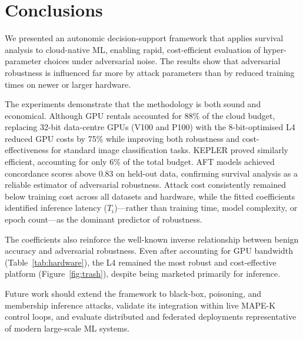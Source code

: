 \documentclass[conference]{IEEEtran}%
\begin{document}
\section{Conclusions}
\label{conclusion}

We presented an autonomic decision-support framework that applies survival analysis to cloud-native ML, enabling rapid, cost-efficient evaluation of hyper-parameter choices under adversarial noise. 
The results show that adversarial robustness is influenced far more by attack parameters than by reduced training times on newer or larger hardware.

The experiments demonstrate that the methodology is both sound and economical. 
Although GPU rentals accounted for 88\% of the cloud budget, replacing 32-bit data-centre GPUs (V100 and P100) with the 8-bit-optimised L4 reduced GPU costs by 75\% while improving both robustness and cost-effectiveness for standard image classification tasks. 
KEPLER proved similarly efficient, accounting for only 6\% of the total 
budget. AFT models achieved concordance scores above 0.83 on held-out data, confirming survival analysis as a reliable estimator of adversarial robustness. 
Attack cost consistently remained below training cost across all datasets and hardware, while the fitted coefficients identified inference latency ($T_i$)—rather than training time, model complexity, or epoch count—as the dominant predictor of robustness.

The coefficients also reinforce the well-known inverse relationship between benign accuracy and adversarial robustness. 
Even after accounting for GPU bandwidth (Table~\ref{tab:hardware}), the L4 remained the most robust and cost-effective platform (Figure~\ref{fig:trash}), despite being marketed primarily for inference.

Future work should extend the framework to black-box, poisoning, and membership inference attacks, validate its integration within live MAPE-K control loops, and evaluate distributed and federated deployments representative of modern large-scale ML systems.
{}

\end{document}
